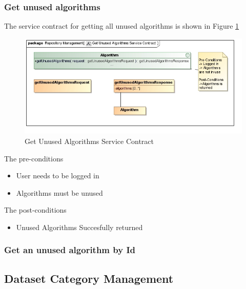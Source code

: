 \subsubsection {Get unused algorithms}
The service contract for getting all unused algorithms is shown in Figure \ref{fig:getUnusedAlgorithmsService}
\begin{figure}[H]
  \begin{center}
  \includegraphics[scale=0.6]{../Diagrams and Charts/Test Data/Get Unused Algorithms Service Contract.jpg}
  \caption{Get Unused Algorithms Service Contract}
  \label{fig:getUnusedAlgorithmsService}
  \end{center}
  
\end{figure}

The pre-conditions
\begin{itemize}
  \item User needs to be logged in
  \item Algorithms must be unused
\end{itemize}

The post-conditions
\begin{itemize}
  \item Unused Algorithms Succesfully returned
\end{itemize}
\subsubsection {Get an unused algorithm by Id}

\subsection{Dataset Category Management}

